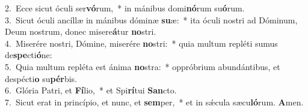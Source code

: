 {2.~}Ecce sicut óculi ser\textbf{vó}rum,~* in mánibus domi\textbf{nó}rum su\textbf{ó}rum.\\
{3.~}Sicut óculi ancíllæ in mánibus dóminæ \textbf{su}æ:~* ita óculi nostri ad Dóminum, Deum nostrum, donec misere\textbf{á}tur \textbf{no}stri.\\
{4.~}Miserére nostri, Dómine, miserére \textbf{no}stri:~* quia multum repléti sumus de\textbf{spe}cti\textbf{ó}ne:\\
{5.~}Quia multum repléta est ánima \textbf{no}stra:~* oppróbrium abundántibus, et despécti\textbf{o} su\textbf{pér}bis.\\
{6.~}Glória Patri, et \textbf{Fí}lio,~* et Spi\textbf{rí}tui \textbf{San}cto.\\
{7.~}Sicut erat in princípio, et nunc, et \textbf{sem}per,~* et in sǽcula sæcu\textbf{ló}rum. \textbf{A}men.\\
